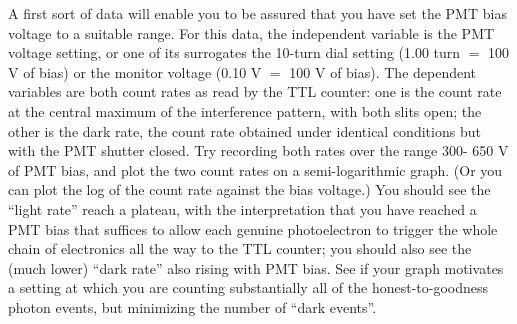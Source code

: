 \documentclass[11pt]{article}
\begin{document}
A first sort of data will enable you to be assured that you have set the PMT
bias voltage to a suitable range. For this data, the independent variable is the
PMT voltage setting, or one of its surrogates the 10-turn dial setting (1.00
turn $=$ 100 V of bias) or the monitor voltage (0.10 V $=$ 100 V of bias). The
dependent variables are both count rates as read by the TTL counter: one is the
count rate at the central maximum of the interference pattern, with both slits
open; the other is the dark rate, the count rate obtained under identical
conditions but with the PMT shutter closed. Try recording both rates over the
range 300- 650 V of PMT bias, and plot the two count rates on a semi-logarithmic
graph. (Or you can plot the log of the count rate against the bias voltage.) You
should see the ``light rate'' reach a plateau, with the interpretation that you
have reached a PMT bias that suffices to allow each genuine photoelectron to
trigger the whole chain of electronics all the way to the TTL counter; you
should also see the (much lower) ``dark rate'' also rising with PMT bias. See if
your graph motivates a setting at which you are counting substantially all of
the honest-to-goodness photon events, but minimizing the number of ``dark
events''.
\end{document}
